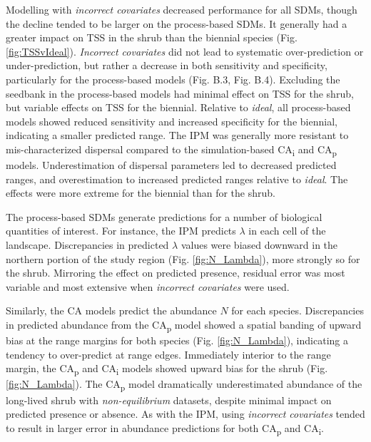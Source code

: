 \documentclass[preprint,review,times,12pt]{elsarticle}
\begin{document}
Modelling with \emph{incorrect covariates} decreased performance for all SDMs, though the decline tended to be larger on the process-based SDMs. It generally had a greater impact on TSS in the shrub than the biennial species (Fig. \ref{fig:TSSvIdeal}). \emph{Incorrect covariates} did not lead to systematic over-prediction or under-prediction, but rather a decrease in both sensitivity and specificity, particularly for the process-based models (Fig. B.3, Fig. B.4). Excluding the seedbank in the process-based models had minimal effect on TSS for the shrub, but variable effects on TSS for the biennial. Relative to \emph{ideal}, all process-based models showed reduced sensitivity and increased specificity for the biennial, indicating a smaller predicted range. The IPM was generally more resistant to mis-characterized dispersal compared to the simulation-based CA\textsubscript{i} and CA\textsubscript{p} models. Underestimation of dispersal parameters led to decreased predicted ranges, and overestimation to increased predicted ranges relative to \emph{ideal}. The effects were more extreme for the biennial than for the shrub.

The process-based SDMs generate predictions for a number of biological quantities of interest. For instance, the IPM predicts $\lambda$ in each cell of the landscape. Discrepancies in predicted $\lambda$ values were biased downward in the northern portion of the study region (Fig. \ref{fig:N_Lambda}), more strongly so for the shrub. Mirroring the effect on predicted presence, residual error was most variable and most extensive when \emph{incorrect covariates} were used. 

Similarly, the CA models predict the abundance $N$ for each species. Discrepancies in predicted abundance from the CA\textsubscript{p} model showed a spatial banding of upward bias at the range margins for both species (Fig. \ref{fig:N_Lambda}), indicating a tendency to over-predict at range edges. Immediately interior to the range margin, the CA\textsubscript{p} and CA\textsubscript{i} models showed upward bias for the shrub (Fig. \ref{fig:N_Lambda}). The CA\textsubscript{p} model dramatically underestimated abundance of the long-lived shrub with \emph{non-equilibrium} datasets, despite minimal impact on predicted presence or absence. As with the IPM, using \emph{incorrect covariates} tended to result in larger error in abundance predictions for both CA\textsubscript{p} and CA\textsubscript{i}.
\end{document}
